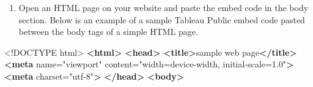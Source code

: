 \documentclass[
  english,
]{book}
\newenvironment{Shaded}{\begin{snugshade}}{\end{snugshade}}
\newcommand{\DataTypeTok}[1]{\textcolor[rgb]{0.13,0.29,0.53}{#1}}
\newcommand{\KeywordTok}[1]{\textcolor[rgb]{0.13,0.29,0.53}{\textbf{#1}}}
\newcommand{\NormalTok}[1]{#1}
\newcommand{\OtherTok}[1]{\textcolor[rgb]{0.56,0.35,0.01}{#1}}
\newcommand{\StringTok}[1]{\textcolor[rgb]{0.31,0.60,0.02}{#1}}
\providecommand{\tightlist}{%
  \setlength{\itemsep}{0pt}\setlength{\parskip}{0pt}}
\begin{document}
\begin{enumerate}
\def\labelenumi{\arabic{enumi})}
\setcounter{enumi}{4}
\tightlist
\item
  Open an HTML page on your website and paste the embed code in the body section. Below is an example of a sample Tableau Public embed code pasted between the body tags of a simple HTML page.
\end{enumerate}

\begin{Shaded}
\begin{Highlighting}[]
\DataTypeTok{<!DOCTYPE }\NormalTok{html}\DataTypeTok{>}
\KeywordTok{<html>}
\KeywordTok{<head>}
  \KeywordTok{<title>}\NormalTok{sample web page}\KeywordTok{</title>}
  \KeywordTok{<meta}\OtherTok{ name=}\StringTok{"viewport"}\OtherTok{ content=}\StringTok{"width=device{-}width, initial{-}scale=1.0"}\KeywordTok{>}
  \KeywordTok{<meta}\OtherTok{ charset=}\StringTok{"utf{-}8"}\KeywordTok{>}
\KeywordTok{</head>}
\KeywordTok{<body>}

\end{Highlighting}
\end{Shaded}
\end{document}
